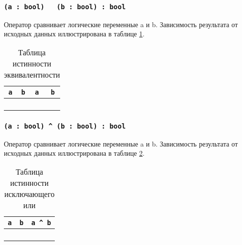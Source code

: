 \subsubsection{\texttt{(a : bool) ~ (b : bool) : bool}}

Оператор сравнивает логические переменные a и b. Зависимость результата от исходных данных иллюстрирована в таблице \ref{logeqtable}.

\begin{table}[htb]
	\caption{Таблица истинности эквивалентности}
	\label{logeqtable}
	\begin{tabular}{|c|c|c|}
		\hline
		\texttt{a} & \texttt{b} & \texttt{a ~ b} \\ \hline
		\false{} & \false{} & \true{}   	\\ \hline
		\false{} & \true{}  & \false{}  	\\ \hline
		\true{}  & \false{} & \false{}  	\\ \hline
		\true{}  & \true{}  & \true{}   	\\ \hline
	\end{tabular}
	\vspace{0em}
\end{table}

\subsubsection{\texttt{(a : bool) ^ (b : bool) : bool}}

Оператор сравнивает логические переменные a и b. Зависимость результата от исходных данных иллюстрирована в таблице \ref{logdifftable}.

\begin{table}[htb]
	\caption{Таблица истинности исключающего или}
	\label{logdifftable}
	\begin{tabular}{|c|c|c|}
		\hline
		\texttt{a} & \texttt{b} & \texttt{a ^ b} \\ \hline
		\false{} & \false{} & \false{}  	\\ \hline
		\false{} & \true{}  & \true{}   	\\ \hline
		\true{}  & \false{} & \true{}  		\\ \hline
		\true{}  & \true{}  & \false{}  	\\ \hline
	\end{tabular}
	\vspace{-2em}
\end{table}

